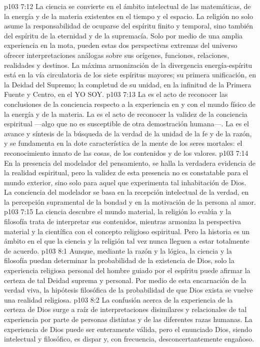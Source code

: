 \vs p103 7:12 La ciencia se convierte en el ámbito intelectual de las matemáticas, de la energía y de la materia existentes en el tiempo y el espacio. La religión no solo asume la responsabilidad de ocuparse del espíritu finito y temporal, sino también del espíritu de la eternidad y de la supremacía. Solo por medio de una amplia experiencia en la mota, pueden estas dos perspectivas extremas del universo ofrecer interpretaciones análogas sobre sus orígenes, funciones, relaciones, realidades y destinos. La máxima armonización de la divergencia energía\hyp{}espíritu está en la vía circulatoria de los siete espíritus mayores; su primera unificación, en la Deidad del Supremo; la completud de su unidad, en la infinitud de la Primera Fuente y Centro, en el YO SOY.
\vs p103 7:13 \pc La  es el acto de reconocer las conclusiones de la conciencia respecto a la experiencia en y con el mundo físico de la energía y de la materia. La  es el acto de reconocer la validez de la conciencia espiritual ---algo que no es susceptible de otra demostración humana---. La  es el avance y síntesis de la búsqueda de la verdad de la unidad de la fe y de la razón, y se fundamenta en la dote característica de la mente de los seres mortales: el reconocimiento innato de las cosas, de los contenidos y de los valores.
\vs p103 7:14 \pc En la presencia del modelador del pensamiento, se halla la verdadera evidencia de la realidad espiritual, pero la validez de esta presencia no es constatable para el mundo exterior, sino solo para aquel que experimenta tal inhabitación de Dios. La conciencia del modelador se basa en la recepción intelectual de la verdad, en la percepción supramental de la bondad y en la motivación de la persona al amor.
\vs p103 7:15 La ciencia descubre el mundo material, la religión lo evalúa y la filosofía trata de interpretar sus contenidos, mientras armoniza la perspectiva material y la científica con el concepto religioso espiritual. Pero la historia es un ámbito en el que la ciencia y la religión tal vez nunca lleguen a estar totalmente de acuerdo.
\vs p103 8:1 Aunque, mediante la razón y la lógica, la ciencia y la filosofía puedan determinar la probabilidad de la existencia de Dios, solo la experiencia religiosa personal del hombre guiado por el espíritu puede afirmar la certeza de tal Deidad suprema y personal. Por medio de esta encarnación de la verdad viva, la hipótesis filosófica de la probabilidad de que Dios exista se vuelve una realidad religiosa.
\vs p103 8:2 La confusión acerca de la experiencia de la certeza de Dios surge a raíz de interpretaciones disimilares y relacionales de tal experiencia por parte de personas distintas y de las diferentes razas humanas. La experiencia de Dios puede ser enteramente válida, pero el enunciado  Dios, siendo intelectual y filosófico, es dispar y, con frecuencia, desconcertantemente engañoso.
